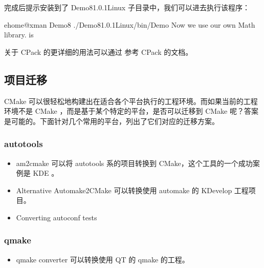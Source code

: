 \documentclass[a4paper,12pt,english]{sphinxmanual}
\begin{document}
\sphinxAtStartPar
完成后提示安装到了 Demo8\sphinxhyphen{}1.0.1\sphinxhyphen{}Linux 子目录中，我们可以进去执行该程序：

\begin{sphinxVerbatim}[commandchars=\\\{\}]
\PYG{o}{[}ehome@xman Demo8\PYG{o}{]}\PYGZdl{} ./Demo8\PYGZhy{}1.0.1\PYGZhy{}Linux/bin/Demo  
Now we use our own Math library.
 \PYGZca{}  is 
\end{sphinxVerbatim}

\sphinxAtStartPar
关于 CPack 的更详细的用法可以通过  参考 CPack 的文档。


\subsection{项目迁移}
\label{\detokenize{dev-board/cmake:id16}}
\sphinxAtStartPar
CMake 可以很轻松地构建出在适合各个平台执行的工程环境。而如果当前的工程环境不是 CMake ，而是基于某个特定的平台，是否可以迁移到 CMake 呢？答案是可能的。下面针对几个常用的平台，列出了它们对应的迁移方案。


\subsubsection{autotools}
\label{\detokenize{dev-board/cmake:autotools}}\begin{itemize}
\item {} 
\sphinxAtStartPar
am2cmake 可以将 autotools 系的项目转换到 CMake，这个工具的一个成功案例是 KDE 。

\item {} 
\sphinxAtStartPar
Alternative Automake2CMake 可以转换使用 automake 的 KDevelop 工程项目。

\item {} 
\sphinxAtStartPar
Converting autoconf tests

\end{itemize}


\subsubsection{qmake}
\label{\detokenize{dev-board/cmake:qmake}}\begin{itemize}
\item {} 
\sphinxAtStartPar
qmake converter 可以转换使用 QT 的 qmake 的工程。

\end{itemize}
\end{document}
